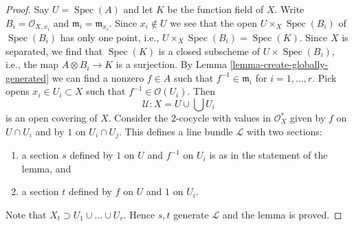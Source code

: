 \documentclass[10pt,a4paper]{amsart}
\theoremstyle{plain}
\theoremstyle{definition}
\theoremstyle{remark}
\numberwithin{equation}{subsection}
\def\Spec{\mathop{\mathrm{Spec}}}
\begin{document}
\begin{proof}
Say $U = \Spec(A)$ and let $K$ be the function field of $X$.
Write $B_i = \mathcal{O}_{X, x_i}$ and $\mathfrak m_i = \mathfrak m_{x_i}$.
Since $x_i \not \in U$ we see that the open
$U \times_X \Spec(B_i)$ of $\Spec(B_i)$ has only one point, i.e.,
$U \times_X \Spec(B_i) = \Spec(K)$.
Since $X$ is separated, we find that $\Spec(K)$ is a closed subscheme
of $U \times \Spec(B_i)$, i.e., the map $A \otimes B_i \to K$ is a surjection.
By Lemma \ref{lemma-create-globally-generated} we can find a nonzero
$f \in A$ such that $f^{-1} \in \mathfrak m_i$ for $i = 1, \ldots, r$.
Pick opens $x_i \in U_i \subset X$ such that $f^{-1} \in \mathcal{O}(U_i)$.
Then
$$
\mathcal{U} : X = U \cup \bigcup U_i
$$
is an open covering of $X$. Consider the $2$-cocycle with values
in $\mathcal{O}_X^*$ given by $f$ on $U \cap U_i$ and by
$1$ on $U_i \cap U_j$. This defines a line bundle $\mathcal{L}$
with two sections:
\begin{enumerate}
\item a section $s$ defined by $1$ on $U$
and $f^{-1}$ on $U_i$ is as in the statement of the lemma, and
\item a section $t$ defined by $f$ on $U$ and
$1$ on $U_i$.
\end{enumerate}
Note that $X_t \supset U_1 \cup \ldots \cup U_r$.
Hence $s, t$ generate $\mathcal{L}$ and the lemma is proved.
\end{proof}
\end{document}
